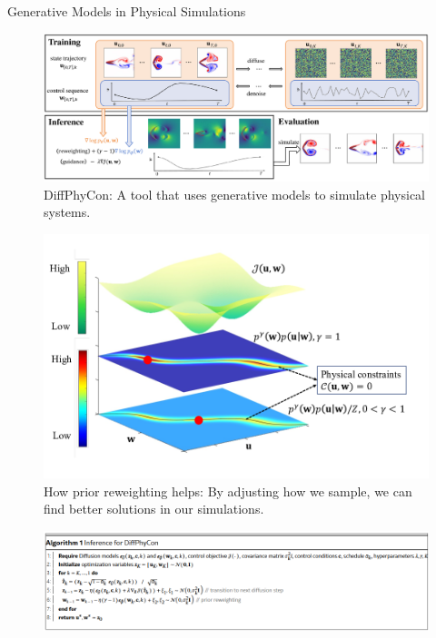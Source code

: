 \begin{frame}[allowframebreaks]{Generative Models in Physical Simulations}
    \framebreak
    \begin{figure}
        \centering
        \includegraphics[height=0.85\textheight,width=1\textwidth,keepaspectratio]{images/science/generative-models-diffphycon.png}
        \caption*{DiffPhyCon: A tool that uses generative models to simulate physical systems.}
    \end{figure}

    \framebreak
    \begin{figure}
        \centering
        \includegraphics[height=0.65\textheight,width=1\textwidth,keepaspectratio]{images/science/generative-models-intuit.png}
        \caption*{How prior reweighting helps: By adjusting how we sample, we can find better solutions in our simulations.}
    \end{figure}

    \framebreak
    \begin{figure}
        \centering
        \includegraphics[height=0.9\textheight,width=1.05\textwidth,keepaspectratio]{images/science/generative-models-algo.png}
    \end{figure}


\end{frame}

